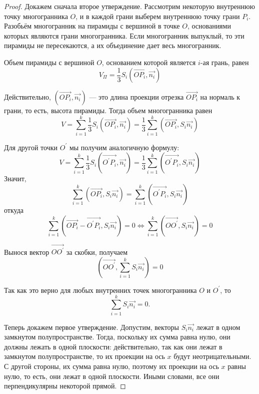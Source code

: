 \begin{proof}
    Докажем сначала второе утверждение. Рассмотрим некоторую внутреннюю точку многогранника $O$, и в каждой грани выберем внутреннюю точку грани $P_i$. Разобьём многогранник на пирамиды с вершиной в точке $O$, основаниями которых являются грани многогранника. Если многогранник выпуклый, то эти пирамиды не пересекаются, а их объединение дает весь многогранник.

    Объем пирамиды с вершиной $O$, основанием которой является $i$-ая грань, равен
    $$V_{\Pi}=\frac{1}{3} S_i\left(\overrightarrow{O P_i}, \overrightarrow{n_i}\right)$$

    Действительно, $\left(\overrightarrow{O P_i}, \overrightarrow{n_i}\right)$ — это длина проекции отрезка $\overrightarrow{O P_i}$ на нормаль к грани, то есть, высота пирамиды. Тогда объем многогранника равен
    $$V=\sum_{i=1}^k \frac{1}{3} S_i\left(\overrightarrow{O P_i}, \overrightarrow{n_i}\right)=\frac{1}{3} \sum_{i=1}^k\left(\overrightarrow{O P_i}, S_i \overrightarrow{n_i}\right)$$

    Для другой точки $O^{\prime}$ мы получим аналогичную формулу:
    $$V=\sum_{i=1}^k \frac{1}{3} S_i\left(\overrightarrow{O^{\prime} P_i}, \overrightarrow{n_i}\right)=\frac{1}{3} \sum_{i=1}^k\left(\overrightarrow{O^{\prime} P_i}, S_i \overrightarrow{n_i}\right)$$
    Значит,
    $$\sum_{i=1}^k\left(\overrightarrow{O P_i}, S_i \overrightarrow{n_i}\right)=\sum_{i=1}^k\left(\overrightarrow{O^{\prime} P_i}, S_i \overrightarrow{n_i}\right)$$
    откуда
    $$\sum_{i=1}^k\left(\overrightarrow{O P_i}-\overrightarrow{O^{\prime} P_i}, S_i \overrightarrow{n_i}\right)=0 \Longleftrightarrow \sum_{i=1}^k\left(\overrightarrow{O O^{\prime}}, S_i \overrightarrow{n_i}\right)=0$$

    Вынося вектор $\overrightarrow{O O^{\prime}}$ за скобки, получаем
    $$\left(\overrightarrow{O O^{\prime}}, \sum_{i=1}^k S_i \overrightarrow{n_i}\right)=0$$

    Так как это верно для любых внутренних точек многогранника $O$ и $O^{\prime}$, то
    $$\sum_{i=1}^{k} S_i \overrightarrow{n_i} = 0.$$

    Теперь докажем первое утверждение. Допустим, векторы $S_i \overrightarrow{n_i}$ лежат в одном замкнутом полупространстве. Тогда, поскольку их сумма равна нулю, они должны лежать в одной плоскости: действительно, так как они лежат в замкнутом полупространстве, то их проекции на ось $x$ будут неотрицательными. С другой стороны, их сумма равна нулю, поэтому их проекции на ось $x$ равны нулю, то есть, они лежат в одной плоскости. Иными словами, все они перпендикулярны некоторой прямой.


\end{proof}
